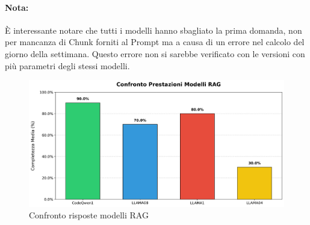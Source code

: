 \documentclass[12pt,a4paper,openright,twoside]{book}
\begin{document}
\paragraph{Nota:} È interessante notare che tutti i modelli hanno sbagliato la prima domanda,
non per mancanza di Chunk forniti al Prompt ma a causa di un errore nel calcolo del giorno della settimana.
Questo errore non si sarebbe verificato con le versioni con più parametri degli stessi modelli.
\newpage
\begin{figure}[h]
    \centering
    \includegraphics[width=\textwidth]{figures/confronto_valutazioni_modelli.png}
    \caption{Confronto risposte modelli RAG}
    \label{fig:confronto-modelli}
\end{figure}
\end{document}
